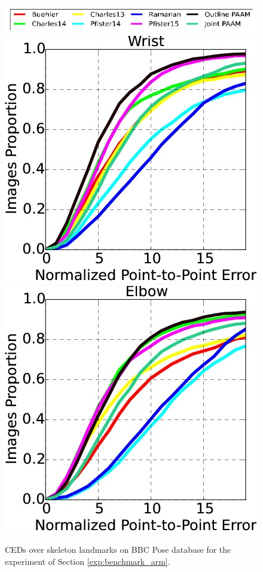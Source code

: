 \begin{figure}
    \centering
    \includegraphics[width=\columnwidth]{resources/Annotation_Correction/HandBenchmark/legend}
    \\
    \includegraphics[width=0.48\columnwidth]{resources/Annotation_Correction/HandBenchmark/wrist}
    \includegraphics[width=0.48\columnwidth]{resources/Annotation_Correction/HandBenchmark/elbow}
    \caption{CEDs over skeleton landmarks on BBC Pose database for the experiment of Section  \ref{exp:benchmark_arm}.}
    \label{fig:hand_benchmark}
\end{figure}
~
